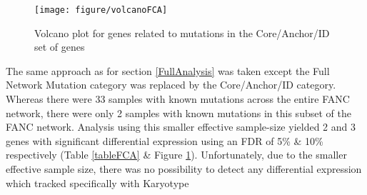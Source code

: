 \documentclass{article}\usepackage{knitr}
\begin{document}
\begin{knitrout}
\color{fgcolor}\begin{figure}[]


{\centering \texttt{[image: figure/volcanoFCA]} 

}

\caption[Volcano plot for genes related to mutations in the Core/Anchor/ID set of genes]{Volcano plot for genes related to mutations in the Core/Anchor/ID set of genes\label{fig:volcanoFCA}}
\end{figure}


\end{knitrout}


The same approach as for section \ref{FullAnalysis} was taken except the Full Network Mutation category was replaced by the Core/Anchor/ID category.
Whereas there were 33 samples with known mutations across the entire FANC network, there were only 2 samples with known mutations in this subset of the FANC network.
Analysis using this smaller effective sample-size yielded 2 and 3 genes with significant differential expression using an FDR of 5\% \& 10\% respectively (Table \ref{tableFCA} \& Figure \ref{fig:volcanoFCA}).
Unfortunately, due to the smaller effective sample size, there was no possibility to detect any differential expression which tracked specifically with Karyotype
\end{document}
